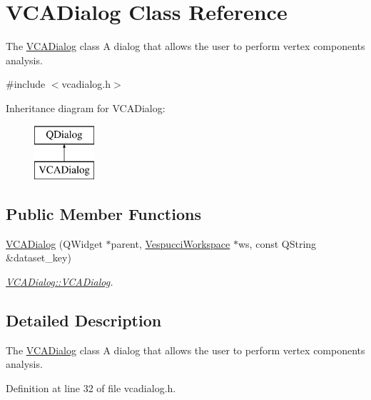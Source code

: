\hypertarget{class_v_c_a_dialog}{}\section{V\+C\+A\+Dialog Class Reference}
\label{class_v_c_a_dialog}


The \hyperlink{class_v_c_a_dialog}{V\+C\+A\+Dialog} class A dialog that allows the user to perform vertex components analysis.  




{\ttfamily \#include $<$vcadialog.\+h$>$}

Inheritance diagram for V\+C\+A\+Dialog\+:\begin{figure}[H]
\begin{center}
\leavevmode
\includegraphics[height=2.000000cm]{class_v_c_a_dialog}
\end{center}
\end{figure}
\subsection*{Public Member Functions}
\begin{DoxyCompactItemize}
\item 
\hyperlink{class_v_c_a_dialog_addcb69decb249533a970d8de4656db3a}{V\+C\+A\+Dialog} (Q\+Widget $\ast$parent, \hyperlink{class_vespucci_workspace}{Vespucci\+Workspace} $\ast$ws, const Q\+String \&dataset\+\_\+key)
\begin{DoxyCompactList}\small\item\em \hyperlink{class_v_c_a_dialog_addcb69decb249533a970d8de4656db3a}{V\+C\+A\+Dialog\+::\+V\+C\+A\+Dialog}. \end{DoxyCompactList}\end{DoxyCompactItemize}


\subsection{Detailed Description}
The \hyperlink{class_v_c_a_dialog}{V\+C\+A\+Dialog} class A dialog that allows the user to perform vertex components analysis. 

Definition at line 32 of file vcadialog.\+h.



